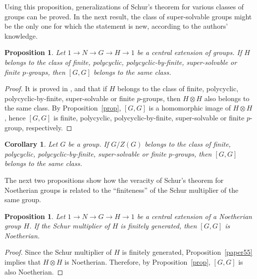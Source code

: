 \documentclass[12pt,reqno]{amsart}
\newtheorem{proposition}[subsection]{Proposition}
\newtheorem{corollary}[subsection]{Corollary}
\theoremstyle{definition}
\numberwithin{equation}{section}
\theoremstyle{definition}
\begin{document}
Using this proposition, generalizations of Schur's theorem for various classes of groups can be proved. In the next result, the class of super-solvable groups
might be the only one for which the statement is new, according to the authors' knowledge.

\begin{proposition}
Let $1\to N \to G \to H \to 1$ be a central extension of groups. If $H$ belongs to the class of finite,  polycyclic, polycyclic-by-finite,
super-solvable or finite $p$-groups, then $[G, G]$ belongs to the same class.
\end{proposition}
\begin{proof}   It is proved in \cite{DLT}, \cite{ Ell87f} and \cite{Mo07} that if $H$ belongs to the class of  finite,  polycyclic, polycyclic-by-finite,
super-solvable or finite $p$-groups, then $H\otimes H$ also belongs to the same class.  By Proposition~\ref{prop}, $[G, G]$ is a homomorphic image of $H\otimes H$,
hence $[G, G]$ is finite, polycyclic, polycyclic-by-finite, super-solvable or finite $p$-group, respectively.
\end{proof}

\begin{corollary}
Let $G$ be a group. If $G/Z(G)$ belongs to the class of finite, polycyclic, polycyclic-by-finite, super-solvable or finite $p$-groups,
then $[G, G]$ belongs to the same class.
\end{corollary}

The next two propositions show how the veracity of Schur's theorem for Noetherian groups is related to the ``finiteness'' of the Schur multiplier of the same group.

\begin{proposition}
Let  $1\to N \to G \to H \to 1$ be a central extension of a Noetherian group $H$. If the Schur multiplier of $H$ is finitely generated, then $[G, G]$ is Noetherian.
\end{proposition}

\begin{proof} Since the Schur multiplier of $H$ is finitely generated, Proposition~\ref{paper55} implies that $H\otimes H$ is Noetherian. Therefore,
by Proposition~\ref{prop}, $[G, G]$ is also Noetherian.
\end{proof}
\end{document}

